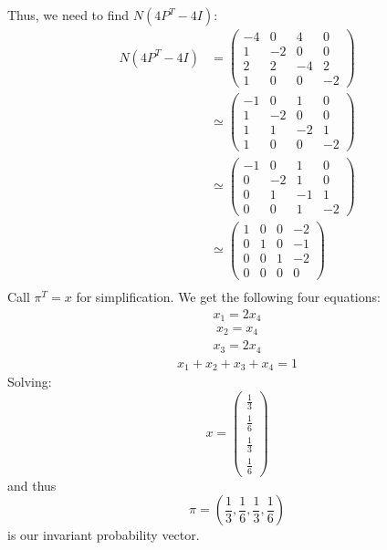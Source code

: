 \documentclass[11pt]{article}
\begin{document}
\begin{problem}
\begin{enumerate}
\begin{solution}
    Thus, we need to find $N(4P^T - 4I):$
    \begin{align*}
        N(4P^T - 4I) &= 
        \begin{pmatrix}
    -4 &0 &4 &0\\
    1 & -2 & 0 &0 \\
    2 & 2 & -4 & 2\\
    1 & 0 & 0 & -2
\end{pmatrix}\\
        &\simeq
        \begin{pmatrix}
    -1 &0 &1 &0\\
    1 & -2 & 0 &0 \\
    1 & 1 & -2 & 1\\
    1 & 0 & 0 & -2
\end{pmatrix}\\
&\simeq
        \begin{pmatrix}
    -1 &0 &1 &0\\
    0 & -2 & 1 &0 \\
    0 & 1 & -1 & 1\\
    0 & 0 & 1 & -2
\end{pmatrix}\\
&\simeq
        \begin{pmatrix}
    1 &0 &0 &-2\\
    0 & 1 & 0 & -1\\
    0 & 0 & 1 &-2 \\
    0 & 0 & 0 & 0
\end{pmatrix}\\
    \end{align*}
    Call $\pi^T = x$ for simplification. We get the following four equations:
    \begin{align}
        x_1 = 2x_4
    \end{align}
    \begin{align}
        x_2 = x_4
    \end{align}
    \begin{align}
        x_3 = 2x_4
    \end{align}
    \begin{align}
        x_1 + x_2 + x_3 + x_4 = 1
    \end{align}
Solving:
\[x = \begin{pmatrix}
    \frac{1}{3}\\
    \frac{1}{6}\\
    \frac{1}{3}\\
    \frac{1}{6}
\end{pmatrix}\] and thus \[\boxed{\pi = (\frac{1}{3},
    \frac{1}{6},
    \frac{1}{3},
    \frac{1}{6})}\] is our invariant probability vector. 


\end{solution}
\end{enumerate}
\end{problem}
\end{document}
